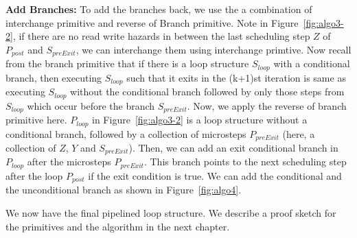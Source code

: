 {\bf Add Branches:}  To add the branches back, we use the a combination of interchange primitive and reverse of Branch primitive. Note in Figure~\ref{fig:algo3-2}, if there are no read write hazards in between the last scheduling step $Z$ of $P_{post}$ and $S_{preExit}$, we can interchange them using interchange primtive. Now recall from the branch primitive that if there is a loop structure $S_{loop}$ with a conditional branch, then executing $S_{loop}$ such that it exits in the (k+1)st iteration is same as executing $S_{loop}$ without the conditional branch followed by only those steps from $S_{loop}$ which occur before the branch $S_{preExit}$. Now, we apply the reverse of branch primitive here. $P_{loop}$ in Figure~\ref{fig:algo3-2} is a loop structure without a conditional branch, followed by a collection of microsteps $P_{preExit}$ (here, a collection of $Z$, $Y$ and $S_{preExit}$). Then, we can add an exit conditional branch in $P_{loop}$ after the microsteps $P_{preExit}$. This branch points to the next scheduling step after the loop $P_{post}$ if the exit condition is true. We can add the conditional and the unconditional branch as shown in  Figure~\ref{fig:algo4}.  

We now have the final pipelined loop structure. We describe a proof sketch for the primitives and the algorithm in the next chapter.

